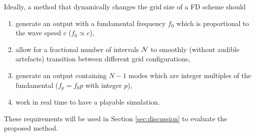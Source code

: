 
Ideally, a method that dynamically changes the grid size of a FD scheme should
\begin{enumerate}[label={r\arabic*.}]
    \item generate an output with a fundamental frequency $f_0$ %
    which is proportional to the wave speed $c$ ($f_0 \propto c$),
    \item allow for a fractional number of intervals $\mathcal{N}$ to smoothly (without audible artefacts) transition between different grid configurations,%
    \item generate an output containing $ N-1$ modes which are integer multiples of the fundamental ($f_p = f_0 p$ with integer $p$),
    \item work in real time to have a playable simulation.
\end{enumerate}
These requirements will be used in Section \ref{sec:discussion} to evaluate the proposed method.
%

